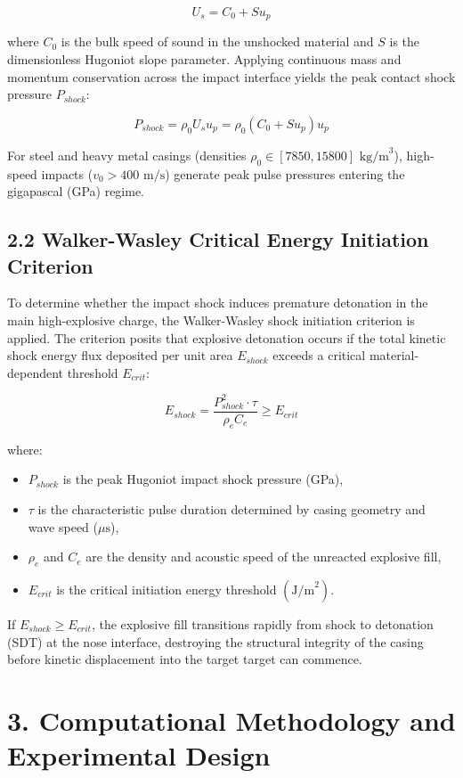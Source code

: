 \documentclass[journal,10pt,twocolumn]{IEEEtran}
\begin{document}
$$U_s = C_0 + S u_p$$

where $C_0$ is the bulk speed of sound in the unshocked material and $S$ is the dimensionless Hugoniot slope parameter. Applying continuous mass and momentum conservation across the impact interface yields the peak contact shock pressure $P_{shock}$:

$$P_{shock} = \rho_0 U_s u_p = \rho_0 (C_0 + S u_p) u_p$$

For steel and heavy metal casings (densities $\rho_0 \in [7850, 15800] \text{ kg/m}^3$), high-speed impacts ($v_0 > 400 \text{ m/s}$) generate peak pulse pressures entering the gigapascal (GPa) regime.

\subsection{2.2 Walker-Wasley Critical Energy Initiation Criterion}
To determine whether the impact shock induces premature detonation in the main high-explosive charge, the Walker-Wasley shock initiation criterion is applied. The criterion posits that explosive detonation occurs if the total kinetic shock energy flux deposited per unit area $E_{shock}$ exceeds a critical material-dependent threshold $E_{crit}$:

$$E_{shock} = \frac{P_{shock}^2 \cdot \tau}{\rho_e C_e} \ge E_{crit}$$

where:
\begin{itemize}
\item $P_{shock}$ is the peak Hugoniot impact shock pressure (GPa),
\item $\tau$ is the characteristic pulse duration determined by casing geometry and wave speed ($\mu\text{s}$),
\item $\rho_e$ and $C_e$ are the density and acoustic speed of the unreacted explosive fill,
\item $E_{crit}$ is the critical initiation energy threshold $(\text{J/m}^2)$.
\end{itemize}

If $E_{shock} \ge E_{crit}$, the explosive fill transitions rapidly from shock to detonation (SDT) at the nose interface, destroying the structural integrity of the casing before kinetic displacement into the target target can commence.



\section{3. Computational Methodology and Experimental Design}
\end{document}
